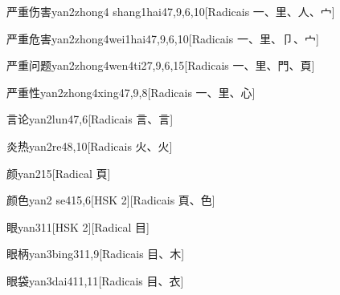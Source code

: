 \begin{entry}{严重伤害}{yan2zhong4 shang1hai4}{7,9,6,10}[Radicais ⼀、⾥、⼈、⼧]
\end{entry}

\begin{entry}{严重危害}{yan2zhong4wei1hai4}{7,9,6,10}[Radicais ⼀、⾥、⼙、⼧]
\end{entry}

\begin{entry}{严重问题}{yan2zhong4wen4ti2}{7,9,6,15}[Radicais ⼀、⾥、⾨、⾴]
\end{entry}

\begin{entry}{严重性}{yan2zhong4xing4}{7,9,8}[Radicais ⼀、⾥、⼼]
\end{entry}

\begin{entry}{言论}{yan2lun4}{7,6}[Radicais ⾔、⾔]
\end{entry}

\begin{entry}{炎热}{yan2re4}{8,10}[Radicais ⽕、⽕]
\end{entry}

\begin{entry}{颜}{yan2}{15}[Radical ⾴]
\end{entry}

\begin{entry}{颜色}{yan2 se4}{15,6}[HSK 2][Radicais ⾴、⾊]
\end{entry}

\begin{entry}{眼}{yan3}{11}[HSK 2][Radical ⽬]
\end{entry}

\begin{entry}{眼柄}{yan3bing3}{11,9}[Radicais ⽬、⽊]
\end{entry}

\begin{entry}{眼袋}{yan3dai4}{11,11}[Radicais ⽬、⾐]
\end{entry}

